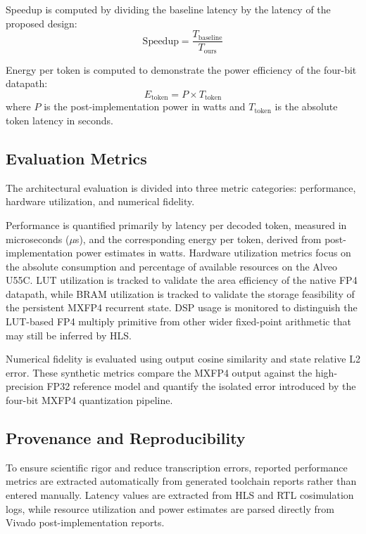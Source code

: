 ﻿\documentclass[conference]{IEEEtran}
\begin{document}
Speedup is computed by dividing the baseline latency by the latency of the proposed design:
\begin{equation}
\text{Speedup} = \frac{T_{\text{baseline}}}{T_{\text{ours}}}
\end{equation}

Energy per token is computed to demonstrate the power efficiency of the four-bit datapath:
\begin{equation}
E_{\text{token}} = P \times T_{\text{token}}
\end{equation}
where $P$ is the post-implementation power in watts and $T_{\text{token}}$ is the absolute token latency in seconds.

\subsection{Evaluation Metrics}
The architectural evaluation is divided into three metric categories: performance, hardware utilization, and numerical fidelity.

Performance is quantified primarily by latency per decoded token, measured in microseconds ($\mu$s), and the corresponding energy per token, derived from post-implementation power estimates in watts. Hardware utilization metrics focus on the absolute consumption and percentage of available resources on the Alveo U55C. LUT utilization is tracked to validate the area efficiency of the native FP4 datapath, while BRAM utilization is tracked to validate the storage feasibility of the persistent MXFP4 recurrent state. DSP usage is monitored to distinguish the LUT-based FP4 multiply primitive from other wider fixed-point arithmetic that may still be inferred by HLS.

Numerical fidelity is evaluated using output cosine similarity and state relative L2 error. These synthetic metrics compare the MXFP4 output against the high-precision FP32 reference model and quantify the isolated error introduced by the four-bit MXFP4 quantization pipeline.

\subsection{Provenance and Reproducibility}
To ensure scientific rigor and reduce transcription errors, reported performance metrics are extracted automatically from generated toolchain reports rather than entered manually. Latency values are extracted from HLS and RTL cosimulation logs, while resource utilization and power estimates are parsed directly from Vivado post-implementation reports.
\end{document}
